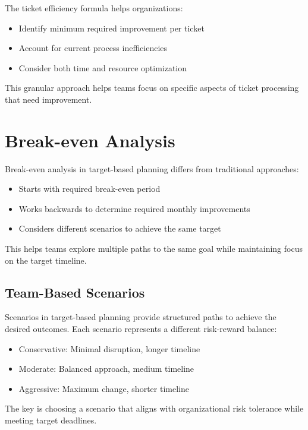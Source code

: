 \documentclass[12pt,a4paper]{article}
\newenvironment{explanation}
{\begin{mdframed}[style=explanationstyle,frametitle={Explanation}]}
{\end{mdframed}}
\begin{document}
\begin{explanation}
The ticket efficiency formula helps organizations:
\begin{itemize}
    \item Identify minimum required improvement per ticket
    \item Account for current process inefficiencies
    \item Consider both time and resource optimization
\end{itemize}
This granular approach helps teams focus on specific aspects of ticket processing that need improvement.
\end{explanation}

\section{Break-even Analysis}

\begin{explanation}
Break-even analysis in target-based planning differs from traditional approaches:
\begin{itemize}
    \item Starts with required break-even period
    \item Works backwards to determine required monthly improvements
    \item Considers different scenarios to achieve the same target
\end{itemize}
This helps teams explore multiple paths to the same goal while maintaining focus on the target timeline.
\end{explanation}

\subsection{Team-Based Scenarios}

\begin{explanation}
Scenarios in target-based planning provide structured paths to achieve the desired outcomes. Each scenario represents a different risk-reward balance:
\begin{itemize}
    \item Conservative: Minimal disruption, longer timeline
    \item Moderate: Balanced approach, medium timeline
    \item Aggressive: Maximum change, shorter timeline
\end{itemize}
The key is choosing a scenario that aligns with organizational risk tolerance while meeting target deadlines.
\end{explanation}
\end{document}

